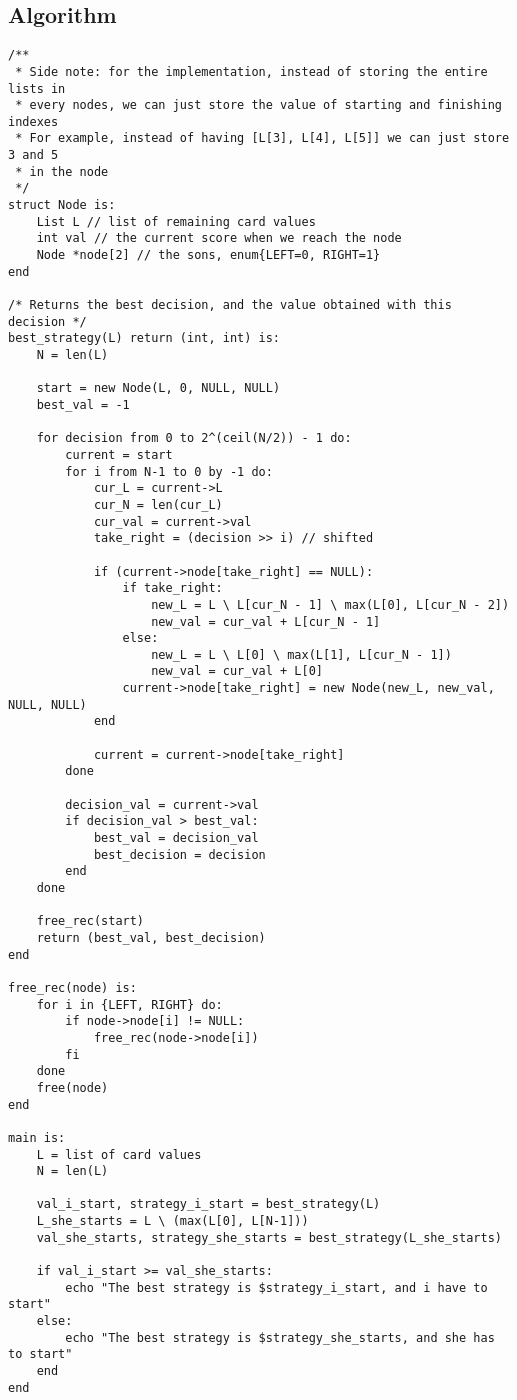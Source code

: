 \documentclass[11pt]{article}
\begin{document}
\subsection{Algorithm}
\begin{lstlisting}
/**
 * Side note: for the implementation, instead of storing the entire lists in
 * every nodes, we can just store the value of starting and finishing indexes
 * For example, instead of having [L[3], L[4], L[5]] we can just store 3 and 5
 * in the node
 */
struct Node is:
	List L // list of remaining card values
	int val // the current score when we reach the node
	Node *node[2] // the sons, enum{LEFT=0, RIGHT=1}
end

/* Returns the best decision, and the value obtained with this decision */
best_strategy(L) return (int, int) is:
	N = len(L)
	
	start = new Node(L, 0, NULL, NULL)
	best_val = -1

	for decision from 0 to 2^(ceil(N/2)) - 1 do:
		current = start
		for i from N-1 to 0 by -1 do:
			cur_L = current->L
			cur_N = len(cur_L)
			cur_val = current->val
			take_right = (decision >> i) // shifted
			
			if (current->node[take_right] == NULL):
				if take_right:
					new_L = L \ L[cur_N - 1] \ max(L[0], L[cur_N - 2])
					new_val = cur_val + L[cur_N - 1]
				else:
					new_L = L \ L[0] \ max(L[1], L[cur_N - 1])
					new_val = cur_val + L[0]
				current->node[take_right] = new Node(new_L, new_val, NULL, NULL)
			end
		
			current = current->node[take_right]
		done
	
		decision_val = current->val
		if decision_val > best_val:
			best_val = decision_val
			best_decision = decision
		end
	done

	free_rec(start)
	return (best_val, best_decision)
end

free_rec(node) is:
	for i in {LEFT, RIGHT} do:
		if node->node[i] != NULL:
			free_rec(node->node[i])
		fi
	done
	free(node)
end

main is:
	L = list of card values
	N = len(L)

	val_i_start, strategy_i_start = best_strategy(L)
	L_she_starts = L \ (max(L[0], L[N-1]))
	val_she_starts, strategy_she_starts = best_strategy(L_she_starts)

	if val_i_start >= val_she_starts:
		echo "The best strategy is $strategy_i_start, and i have to start"
	else:
		echo "The best strategy is $strategy_she_starts, and she has to start"
	end
end

\end{lstlisting}
\end{document}
